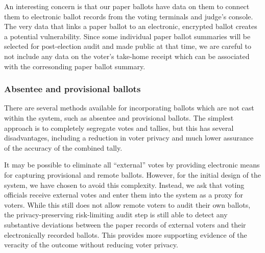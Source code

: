 An interesting concern is that our paper ballots have data on them to connect them to electronic ballot records from the voting terminals and judge's console. The very data that links a paper ballot to an electronic, encrypted ballot creates a potential vulnerability. Since some individual paper ballot summaries will be selected for post-election audit and made public at that time, we are careful to not include any data on the voter's take-home receipt which can be associated with the corresonding paper ballot summary.




\subsubsection{Absentee and provisional ballots}
There are several methods available for incorporating ballots which are not cast within the \projname system, such as absentee and provisional ballots.  The simplest approach is to completely segregate votes and tallies, but this has several disadvantages, including a reduction in voter privacy and much lower assurance of the accuracy of the combined tally.

It may be possible to eliminate all ``external'' votes by providing electronic means for capturing provisional and remote ballots.  However, for the initial design of the \projname system, we have chosen to avoid this complexity.  Instead, we ask that voting officials receive external votes and enter them into the \projname system as a proxy for voters.  While this still does not allow remote voters to audit their own ballots, the privacy-preserving risk-limiting audit step is still able to detect any substantive deviations between the paper records of external voters and their electronically recorded ballots.  This provides more supporting evidence of the veracity of the outcome without reducing voter privacy.


